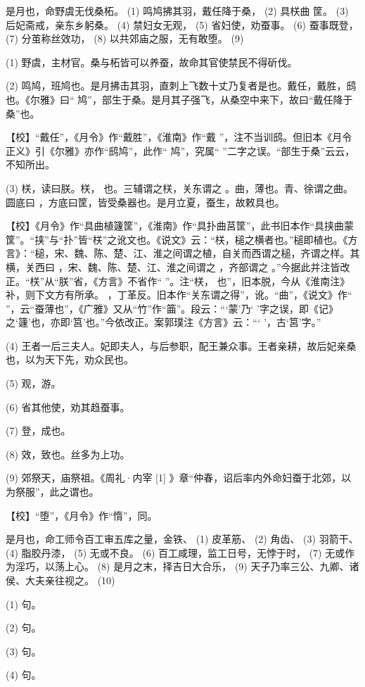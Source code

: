 \documentclass[12pt,UTF8]{ctexbook}
\begin{document}
是月也，命野虞无伐桑柘。 (1) 鸣鸠拂其羽，戴任降于桑， (2) 具栚曲 筐。 (3) 后妃斋戒，亲东乡躬桑。 (4) 禁妇女无观， (5) 省妇使，劝蚕事。 (6) 蚕事既登， (7) 分茧称丝效功， (8) 以共郊庙之服，无有敢堕。 (9)

(1) 野虞，主材官。桑与柘皆可以养蚕，故命其官使禁民不得斫伐。

(2) 鸣鸠，班鸠也。是月拂击其羽，直刺上飞数十丈乃复者是也。戴任，戴胜，鸱也。《尔雅》曰“ 鸠”，部生于桑。是月其子强飞，从桑空中来下，故曰“戴任降于桑”也。

【校】“戴任”，《月令》作“戴胜”，《淮南》作“戴 ”，注不当训鸱。但旧本《月令正义》引《尔雅》亦作“鸱鸠”，此作“ 鸠”，究属“ ”二字之误。“部生于桑”云云，不知所出。

(3) 栚，读曰朕。栚， 也。三辅谓之栚，关东谓之 。曲，薄也。青、徐谓之曲。圆底曰 ，方底曰筐，皆受桑器也。是月立夏，蚕生，故敕具也。

【校】《月令》作“具曲植籧筐”，《淮南》作“具扑曲莒筐”，此书旧本作“具挟曲蒙筐”。“挟”与“扑”皆“栚”之讹文也。《说文》云：“栚，槌之横者也。”槌即植也。《方言》：“槌，宋、魏、陈、楚、江、淮之间谓之植，自关而西谓之槌，齐谓之样。其横，关西曰 ，宋、魏、陈、楚、江、淮之间谓之 ，齐部谓之 。”今据此并注皆改正。“栚”从“朕”省，《方言》不省作“ ”。注“栚， 也”，旧本脱，今从《淮南注》补，则下文方有所承。 ，丁革反。旧本作“关东谓之得”，讹。“曲”，《说文》作“ ”，云“蚕薄也”，《广雅》又从“竹”作“筁”。段云：“‘蒙’乃‘ ’字之误，即《记》之‘籧’也，亦即‘筥’也。”今依改正。案郭璞注《方言》云：“‘ ’，古‘筥’字。”

(4) 王者一后三夫人。妃即夫人，与后参职，配王兼众事。王者亲耕，故后妃亲桑也，以为天下先，劝众民也。

(5) 观，游。

(6) 省其他使，劝其趋蚕事。

(7) 登，成也。

(8) 效，致也。丝多为上功。

(9) 郊祭天，庙祭祖。《周礼·内宰 [1] 》章“仲春，诏后率内外命妇蚕于北郊，以为祭服”，此之谓也。

【校】“堕”，《月令》作“惰”，同。

是月也，命工师令百工审五库之量，金铁、 (1) 皮革筋、 (2) 角齿、 (3) 羽箭干、 (4) 脂胶丹漆， (5) 无或不良。 (6) 百工咸理，监工日号，无悖于时， (7) 无或作为淫巧，以荡上心。 (8) 是月之末，择吉日大合乐， (9) 天子乃率三公、九卿、诸侯、大夫亲往视之。 (10)

(1) 句。

(2) 句。

(3) 句。

(4) 句。
\end{document}
